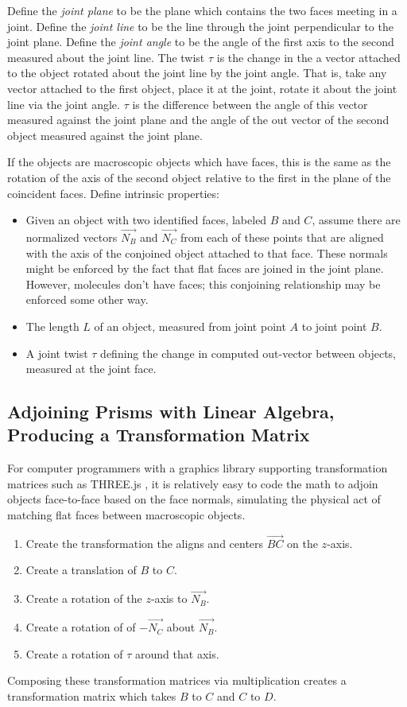 \documentclass[mathematics,article,submit,pdftex,moreauthors]{Definitions/mdpi}
\begin{document}
Define the {\em joint plane} to be the plane which contains the two faces meeting in a joint.
Define the {\em joint line} to be the line through the joint perpendicular to the joint plane.
Define the {\em joint angle} to be the angle of the first axis to the second measured about
the joint line.
The twist $\tau$ is the change in the a vector attached to the object rotated about the joint
line by the joint angle. That is, take any vector attached to the first object, place it at
the joint, rotate it about the joint line via the joint angle. $\tau$ is the difference
between the angle of this vector measured against the joint plane and the angle of the
out vector of the second object measured against the joint plane.

If the objects are macroscopic objects which have faces, this is the same as the rotation
of the axis of the second object relative to the first in the plane of the coincident faces.
Define intrinsic properties:

\begin{itemize}
\item Given an object with two identified faces, labeled $B$ and $C$, assume there are normalized
  vectors $\overrightarrow{N_B}$ and $\overrightarrow{N_C}$
  from each of these points that are aligned with the axis of the conjoined object attached to
  that face. These normals might be enforced by the fact that flat faces are joined in the joint plane.
  However, molecules don't have faces; this conjoining relationship may be enforced some other way.
\item The length $L$ of an object, measured from joint point $A$ to joint point $B$.
\item A joint twist $\tau$ defining the change in computed out-vector between objects,
  measured at the joint face.
\end{itemize}

\subsection{Adjoining Prisms with Linear Algebra, Producing a Transformation Matrix}
\label{sec:adjoin}

For computer programmers with a graphics library supporting transformation matrices such
as THREE.js \cite{dirksen2013learning},
it is relatively easy to code the math to adjoin objects
face-to-face based on the face normals, simulating the physical act of
matching flat faces between macroscopic objects.
\begin{enumerate}
  \item Create the transformation the aligns and centers $\overrightarrow{BC}$ on the $z$-axis.
\item Create a translation of $B$ to $C$.
\item Create a rotation of the $z$-axis to  $\overrightarrow{N_B}$.
\item Create a rotation of of $-\overrightarrow{N_C}$ about $\overrightarrow{N_B}$.
  \item Create a rotation of $\tau$ around that axis.
\end{enumerate}
Composing these transformation matrices via multiplication creates a
transformation matrix which takes $B$ to $C$ and $C$ to $D$.
\end{document}
